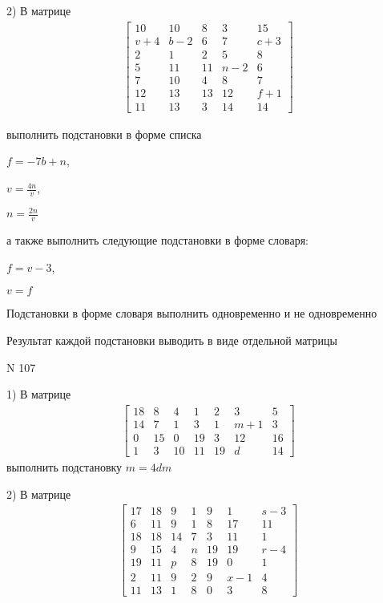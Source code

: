 \documentclass[11pt]{report}
\begin{document}
    2) В матрице
\begin{align*}
\left[\begin{matrix}10 & 10 & 8 & 3 & 15\\v + 4 & b - 2 & 6 & 7 & c + 3\\2 & 1 & 2 & 5 & 8\\5 & 11 & 11 & n - 2 & 6\\7 & 10 & 4 & 8 & 7\\12 & 13 & 13 & 12 & f + 1\\11 & 13 & 3 & 14 & 14\end{matrix}\right]
\end{align*}

выполнить подстановки в форме списка

$f=- 7 b + n$,

$v=\frac{4 n}{v}$,

$n=\frac{2 n}{v}$

а также выполнить следующие подстановки в форме словаря:

$f=v - 3$,

$v=f$


    Подстановки в форме словаря выполнить одновременно и не одновременно


    Результат каждой подстановки выводить в виде отдельной матрицы

\newpage
N 107


    1) В матрице
\begin{align*}
\left[\begin{matrix}18 & 8 & 4 & 1 & 2 & 3 & 5\\14 & 7 & 1 & 3 & 1 & m + 1 & 3\\0 & 15 & 0 & 19 & 3 & 12 & 16\\1 & 3 & 10 & 11 & 19 & d & 14\end{matrix}\right]
\end{align*}
выполнить подстановку $m=4 d m$


    2) В матрице
\begin{align*}
\left[\begin{matrix}17 & 18 & 9 & 1 & 9 & 1 & s - 3\\6 & 11 & 9 & 1 & 8 & 17 & 11\\18 & 18 & 14 & 7 & 3 & 11 & 1\\9 & 15 & 4 & n & 19 & 19 & r - 4\\19 & 11 & p & 8 & 19 & 0 & 1\\2 & 11 & 9 & 2 & 9 & x - 1 & 4\\11 & 13 & 1 & 8 & 0 & 3 & 8\end{matrix}\right]
\end{align*}
\end{document}
